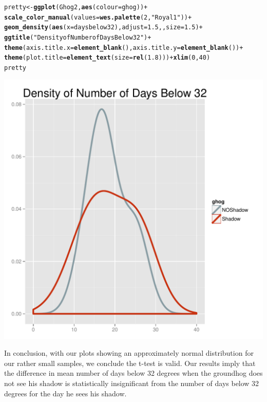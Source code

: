\documentclass[12pt]{article}\usepackage[]{graphicx}\usepackage[]{color}
\makeatletter
\def\maxwidth{ %
  \ifdim\Gin@nat@width>\linewidth
    \linewidth
  \else
    \Gin@nat@width
  \fi
}
\newcommand{\hlnum}[1]{\textcolor[rgb]{0.686,0.059,0.569}{#1}}%
\newcommand{\hlstr}[1]{\textcolor[rgb]{0.192,0.494,0.8}{#1}}%
\newcommand{\hlopt}[1]{\textcolor[rgb]{0,0,0}{#1}}%
\newcommand{\hlstd}[1]{\textcolor[rgb]{0.345,0.345,0.345}{#1}}%
\newcommand{\hlkwb}[1]{\textcolor[rgb]{0.69,0.353,0.396}{#1}}%
\newcommand{\hlkwc}[1]{\textcolor[rgb]{0.333,0.667,0.333}{#1}}%
\newcommand{\hlkwd}[1]{\textcolor[rgb]{0.737,0.353,0.396}{\textbf{#1}}}%
\newenvironment{kframe}{%
 \def\at@end@of@kframe{}%
 \ifinner\ifhmode%
  \def\at@end@of@kframe{\end{minipage}}%
  \begin{minipage}{\columnwidth}%
 \fi\fi%
 \def\FrameCommand##1{\hskip\@totalleftmargin \hskip-\fboxsep
 \colorbox{shadecolor}{##1}\hskip-\fboxsep
     \hskip-\linewidth \hskip-\@totalleftmargin \hskip\columnwidth}%
 \MakeFramed {\advance\hsize-\width
   \@totalleftmargin\z@ \linewidth\hsize
   \@setminipage}}%
 {\par\unskip\endMakeFramed%
 \at@end@of@kframe}
\newenvironment{knitrout}{}{} %
\makeatother
\begin{document}
\begin{knitrout}
\begin{kframe}
\begin{alltt}
\hlstd{pretty} \hlkwb{<-} \hlkwd{ggplot}\hlstd{(Ghog2,}\hlkwd{aes}\hlstd{(}\hlkwc{colour}\hlstd{=ghog))}\hlopt{+}
  \hlkwd{scale_color_manual}\hlstd{(}\hlkwc{values} \hlstd{=} \hlkwd{wes.palette}\hlstd{(}\hlnum{2}\hlstd{,} \hlstr{"Royal1"}\hlstd{))}\hlopt{+}
  \hlkwd{geom_density}\hlstd{(}\hlkwd{aes}\hlstd{(}\hlkwc{x}\hlstd{=daysbelow32),}\hlkwc{adjust}\hlstd{=}\hlnum{1.5}\hlstd{,,}\hlkwc{size}\hlstd{=}\hlnum{1.5} \hlstd{)}  \hlopt{+}
  \hlkwd{ggtitle}\hlstd{(}\hlstr{"Density of Number of Days Below 32"}\hlstd{)}\hlopt{+}
    \hlkwd{theme}\hlstd{(}\hlkwc{axis.title.x} \hlstd{=} \hlkwd{element_blank}\hlstd{(),} \hlkwc{axis.title.y} \hlstd{=} \hlkwd{element_blank}\hlstd{())}\hlopt{+}
   \hlkwd{theme}\hlstd{(}\hlkwc{plot.title} \hlstd{=} \hlkwd{element_text}\hlstd{(}\hlkwc{size} \hlstd{=} \hlkwd{rel}\hlstd{(}\hlnum{1.8}\hlstd{)))} \hlopt{+} \hlkwd{xlim}\hlstd{(}\hlnum{0}\hlstd{,}\hlnum{40}\hlstd{)}
\hlstd{pretty}
\end{alltt}
\end{kframe}
\includegraphics[width=\maxwidth]{figure/plots-2} 

\end{knitrout}

In conclusion, with our plots showing an approximately normal distribution for our rather small samples, we conclude the t-test is valid. Our results imply that the difference in mean number of days below 32 degrees when the groundhog does not see his shadow is statistically insignificant from the number of days below 32 degrees for the day he sees his shadow. 



 
 
 
\end{document}
